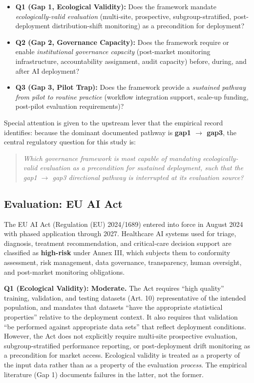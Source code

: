 \begin{itemize}
  \item \textbf{Q1 (Gap 1, Ecological Validity):} Does the
        framework mandate \textit{ecologically-valid evaluation}
        (multi-site, prospective, subgroup-stratified,
        post-deployment distribution-shift monitoring) as a
        precondition for deployment?
  \item \textbf{Q2 (Gap 2, Governance Capacity):} Does the
        framework require or enable \textit{institutional
        governance capacity} (post-market monitoring
        infrastructure, accountability assignment, audit
        capacity) before, during, and after AI deployment?
  \item \textbf{Q3 (Gap 3, Pilot Trap):} Does the framework
        provide a \textit{sustained pathway from pilot to
        routine practice} (workflow integration support,
        scale-up funding, post-pilot evaluation requirements)?
\end{itemize}

Special attention is given to the upstream lever that the
empirical record identifies: because the dominant documented
pathway is \textbf{gap1 $\rightarrow$ gap3}, the central
regulatory question for this study is:

\begin{quote}
\textit{Which governance framework is most capable of mandating
ecologically-valid evaluation as a precondition for sustained
deployment, such that the gap1 $\rightarrow$ gap3 directional
pathway is interrupted at its evaluation source?}
\end{quote}

\subsection{Evaluation: EU AI Act}
\label{sec:eu_ai_act}

The EU AI Act (Regulation (EU) 2024/1689) entered into force in
August 2024 with phased application through 2027. Healthcare AI
systems used for triage, diagnosis, treatment recommendation, and
critical-care decision support are classified as \textbf{high-risk}
under Annex III, which subjects them to conformity assessment,
risk management, data governance, transparency, human oversight,
and post-market monitoring obligations.

\noindent\textbf{Q1 (Ecological Validity): Moderate.}
The Act requires ``high quality'' training, validation, and
testing datasets (Art. 10) representative of the intended
population, and mandates that datasets ``have the appropriate
statistical properties'' relative to the deployment context. It
also requires that validation ``be performed against
appropriate data sets'' that reflect deployment conditions.
However, the Act does not explicitly require multi-site
prospective evaluation, subgroup-stratified performance
reporting, or post-deployment drift monitoring as a
precondition for market access. Ecological validity is treated
as a property of the input data rather than as a property of
the evaluation \textit{process}. The empirical literature
(Gap 1) documents failures in the latter, not the former.

